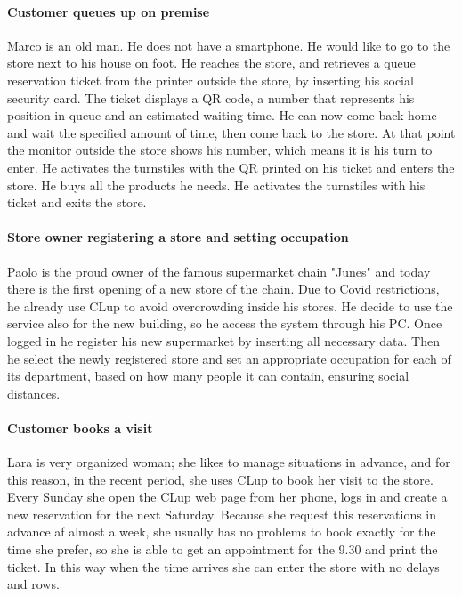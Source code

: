 \paragraph{Customer queues up on premise}
Marco is an old man. He does not have a smartphone. He would like to go to the store next to his house on foot. He reaches the store, and retrieves a queue reservation ticket from the printer outside the store, by inserting his social security card. The ticket displays a QR code, a number that represents his position in queue and an estimated waiting time. He can now come back home and wait the specified amount of time, then come back to the store. At that point the monitor outside the store shows his number, which means it is his turn to enter. He activates the turnstiles with the QR printed on his ticket and enters the store. He buys all the products he needs. He activates the turnstiles with his ticket and exits the store.
\paragraph{Store owner registering a store and setting occupation}
Paolo is the proud owner of the famous supermarket chain "Junes" and today there is the first opening of a new store of the chain. Due to Covid restrictions, he already use CLup to avoid overcrowding inside his stores. He decide to use the service also for the new building, so he access the system through his PC. Once logged in he register his new supermarket by inserting all necessary data. Then he select the newly registered store and set an appropriate occupation for each of its department, based on how many people it can contain, ensuring social distances.
\paragraph{Customer books a visit}
Lara is very organized woman; she likes to manage situations in advance, and for this reason, in the recent period, she uses CLup to book her visit to the store. Every Sunday she open the CLup web page from her phone, logs in and create a new reservation for the next Saturday. Because she request this reservations in advance af almost a week, she usually has no problems to book exactly for the time she prefer, so she is able to get an appointment for the 9.30 and print the ticket. In this way when the time arrives she can enter the store with no delays and rows.

